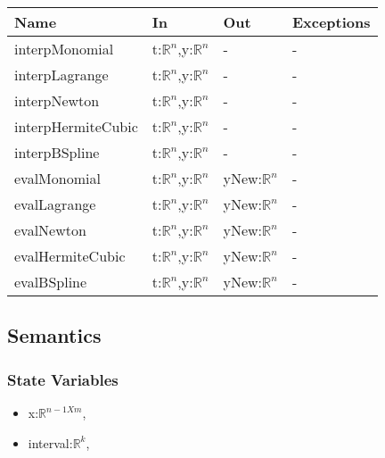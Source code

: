 \documentclass[12pt, titlepage]{article}
\begin{document}
\begin{center}
\begin{tabular}{p{4cm} p{4cm} p{4cm} p{3cm}}
\hline
\textbf{Name} & \textbf{In} & \textbf{Out} & \textbf{Exceptions} \\
\hline
interpMonomial & t:$\mathbb{R}^n$,y:$\mathbb{R}^n$  & - & - \\
interpLagrange & t:$\mathbb{R}^n$,y:$\mathbb{R}^n$ & - & - \\
interpNewton & t:$\mathbb{R}^n$,y:$\mathbb{R}^n$ & - & - \\
interpHermiteCubic & t:$\mathbb{R}^n$,y:$\mathbb{R}^n$ & - & 
- \\
interpBSpline & t:$\mathbb{R}^n$,y:$\mathbb{R}^n$ & - & - \\

evalMonomial & t:$\mathbb{R}^n$,y:$\mathbb{R}^n$ & yNew:$\mathbb{R}^n$  & - \\
evalLagrange & t:$\mathbb{R}^n$,y:$\mathbb{R}^n$ & yNew:$\mathbb{R}^n$ & - \\
evalNewton & t:$\mathbb{R}^n$,y:$\mathbb{R}^n$ & yNew:$\mathbb{R}^n$ & - \\
evalHermiteCubic & t:$\mathbb{R}^n$,y:$\mathbb{R}^n$ & yNew:$\mathbb{R}^n$ & - 
\\
evalBSpline & t:$\mathbb{R}^n$,y:$\mathbb{R}^n$ & yNew:$\mathbb{R}^n$ & - \\
\hline
\end{tabular}
\end{center}

\subsection{Semantics}

\subsubsection{State Variables}
\begin{itemize}
	\item x:$\mathbb{R}^{n-1 X m}$, \\
	
	\item interval:$\mathbb{R}^k$,  \\
	
\end{itemize}
\end{document}
